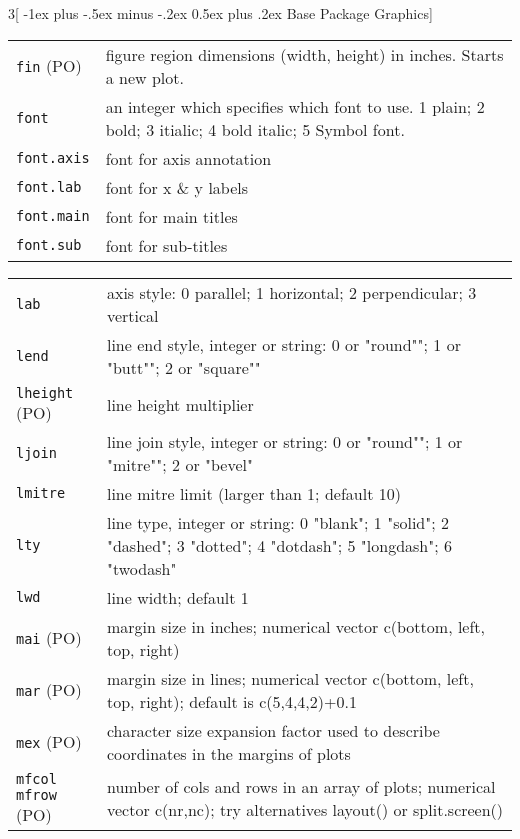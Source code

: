 \documentclass[landscape]{article}
\makeatletter
\renewcommand{\section}{\@startsection{section}{1}{0mm}%
                                {-1ex plus -.5ex minus -.2ex}%
                                {0.5ex plus .2ex}%
                                {\normalfont\large\bfseries}}
\makeatother
\begin{document}
\begin{multicols}{3}[\section{Base Package Graphics}]
\begin{tabular}[t]{@{}p{\widthleftcol}p{\widthrightcol}@{}}
\verb|fin| (PO) & figure region dimensions (width, height) in inches. Starts a new plot. \\
\verb|font| & an integer which specifies which font to use. 1 plain; 2 bold; 3 itialic; 4 bold italic; 5 Symbol font. \\
\verb|font.axis| & font for axis annotation \\
\verb|font.lab| & font for x \& y labels \\
\verb|font.main| & font for main titles \\
\verb|font.sub| & font for sub-titles \\
\hline
\end{tabular}

\setlength{\tabcolsep}{0pt}
\setlength{\tabularwidth}{0.33\textwidth}
\setlength{\widthleftcol}{0.21\tabularwidth}
\setlength{\widthrightcol}{\tabularwidth}
\addtolength{\widthrightcol}{-\widthleftcol}
\begin{tabular}[t]{@{}p{\widthleftcol}p{\widthrightcol}@{}}
\hline
\verb|lab| & axis style: 0 parallel; 1 horizontal; 2 perpendicular; 3 vertical \\
\verb|lend| & line end style, integer or string: 0 or "round""; 1 or "butt""; 2 or "square"" \\
\verb|lheight| (PO) & line height multiplier \\
\verb|ljoin| & line join style, integer or string: 0 or "round""; 1 or "mitre""; 2 or "bevel" \\
\verb|lmitre| & line mitre limit (larger than 1; default 10) \\
\verb|lty| & line type, integer or string: 0 "blank"; 1 "solid"; 2 "dashed"; 3 "dotted"; 4 "dotdash"; 5 "longdash"; 6 "twodash" \\
\verb|lwd| & line width; default 1 \\
\verb|mai| (PO) & margin size in inches; numerical vector c(bottom, left, top, right) \\
\verb|mar| (PO) & margin size in lines; numerical vector c(bottom, left, top, right); default is c(5,4,4,2)+0.1 \\
\verb|mex| (PO) & character size expansion factor used to describe coordinates in the margins of plots \\
\parbox[t]{\widthleftcol}{
    \texttt{mfcol} \\
    \texttt{mfrow} (PO)
    } & number of cols and rows in an array of plots; numerical vector c(nr,nc); try alternatives layout() or split.screen()  \\

\end{tabular}
\end{multicols}
\end{document}
